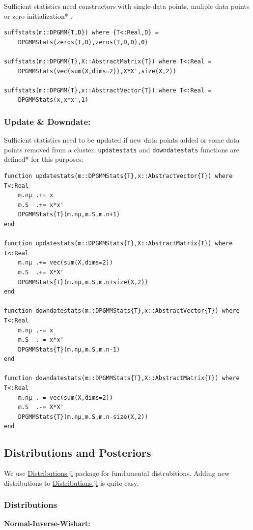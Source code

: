 \documentclass[a4paper]{article}
\begin{document}
Sufficient statistics need constructors with single-data points, muliple
data points or zero initialization* .
\begin{lstlisting}[linewidth=13cm]
suffstats(m::DPGMM{T,D}) where {T<:Real,D} =
    DPGMMStats(zeros(T,D),zeros(T,D,D),0)

suffstats(m::DPGMM{T},X::AbstractMatrix{T}) where T<:Real =
    DPGMMStats(vec(sum(X,dims=2)),X*X',size(X,2))

suffstats(m::DPGMM{T},x::AbstractVector{T}) where T<:Real =
    DPGMMStats(x,x*x',1)
\end{lstlisting}


\subsubsection{Update \& Downdate:}

Sufficient statistics need to be updated if new data points added or
some data points removed from a cluster. \texttt{updatestats} and
\texttt{downdatestats} functions are defined* for this purposes:

\begin{lstlisting}
function updatestats(m::DPGMMStats{T},x::AbstractVector{T}) where T<:Real
    m.nμ .+= x
    m.S  .+= x*x'
    DPGMMStats{T}(m.nμ,m.S,m.n+1)
end

function updatestats(m::DPGMMStats{T},X::AbstractMatrix{T}) where T<:Real
    m.nμ .+= vec(sum(X,dims=2))
    m.S  .+= X*X'
    DPGMMStats{T}(m.nμ,m.S,m.n+size(X,2))
end

function downdatestats(m::DPGMMStats{T},x::AbstractVector{T}) where T<:Real
    m.nμ .-= x
    m.S  .-= x*x'
    DPGMMStats{T}(m.nμ,m.S,m.n-1)
end

function downdatestats(m::DPGMMStats{T},X::AbstractMatrix{T}) where T<:Real
    m.nμ .-= vec(sum(X,dims=2))
    m.S  .-= X*X'
    DPGMMStats{T}(m.nμ,m.S,m.n-size(X,2))
end
\end{lstlisting}


\subsection{Distributions and Posteriors}

We use
\href{https://github.com/JuliaStats/Distributions.jl}{Distributions.jl}
package for fundamental distrubitions. Adding new distributions to
\href{https://github.com/JuliaStats/Distributions.jl}{Distributions.jl}
is quite easy.

\subsubsection{Distributions}
\textbf{Normal-Inverse-Wishart:}
\end{document}

